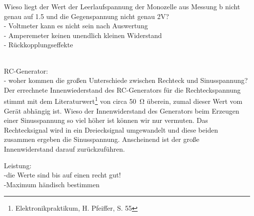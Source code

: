 Wieso liegt der Wert der Leerlaufspannung der Monozelle aus Messung b nicht genau auf 1.5 und die Gegenspannung nicht genau 2V? \\
- Voltmeter kann es nicht sein nach Auswertung \\
- Amperemeter keinen unendlich kleinen Widerstand \\
- Rückkopplungseffekte

\\

RC-Generator: \\
- woher kommen die großen Unterschiede zwischen Rechteck und Sinusspannung? \\
Der errechnete Innenwiederstand des RC-Generators für die Rechteckspannung stimmt mit dem Literaturwert\footnote{Elektronikpraktikum, H. Pfeiffer, S. 55} von circa \SI{50}{\ohm} überein, zumal dieser Wert vom Gerät abhängig ist. Wieso der Innenwiderstand des Generators beim Erzeugen einer Sinusspannung so viel höher ist können wir nur vermuten. Das Rechtecksignal wird in ein Dreiecksignal umgewandelt und diese beiden zusammen ergeben die Sinusspannung. Anscheinend ist der große Innenwiderstand darauf zurückzuführen.




Leistung: \\
-die Werte sind bis auf einen recht gut! \\
-Maximum händisch bestimmen \\